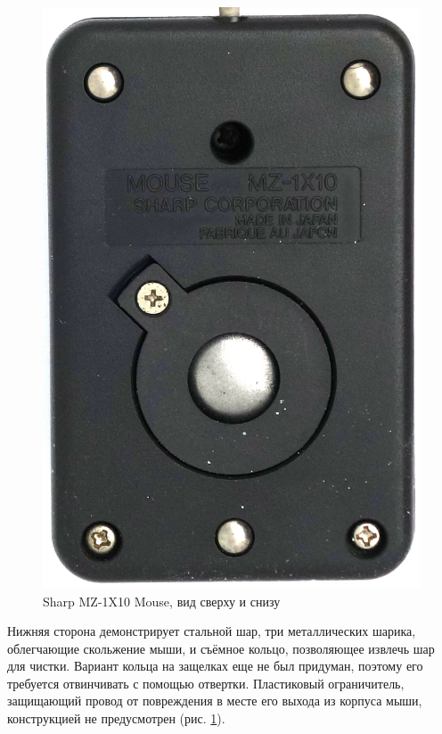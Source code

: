 \documentclass[11pt, a4paper]{article}
\begin{document}
\begin{figure}[h]
    \includegraphics[scale=0.55]{1983_sharp_mz_1x10_mouse/bottom_15.jpg}
    \caption{Sharp MZ-1X10 Mouse, вид сверху и снизу}
    \label{fig:SharpMZ1x10TopAndBottom}
\end{figure}

Нижняя сторона демонстрирует стальной шар, три металлических шарика, облегчающие скольжение мыши, и съёмное кольцо, позволяющее извлечь шар для чистки. Вариант кольца на защелках еще не был придуман, поэтому его требуется отвинчивать с помощью отвертки. Пластиковый ограничитель, защищающий провод от повреждения в месте его выхода из корпуса мыши, конструкцией не предусмотрен (рис. \ref{fig:SharpMZ1x10TopAndBottom}).
\end{document}
